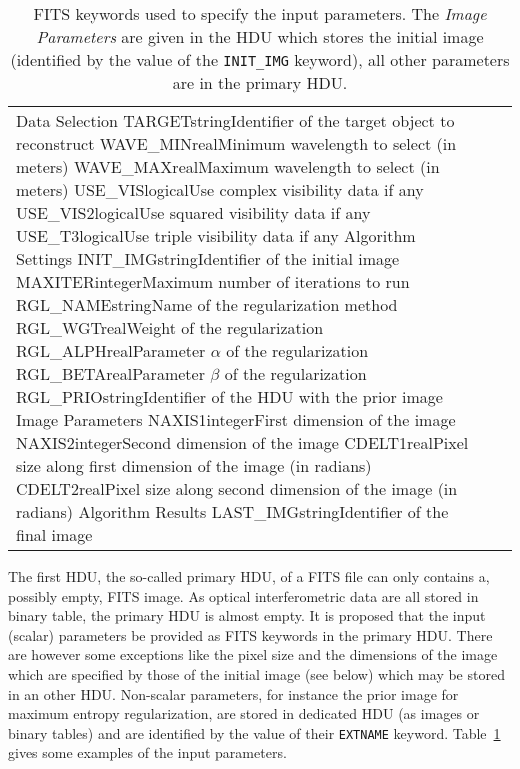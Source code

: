 \documentclass{article}
\newcommand*{\ROW}{} %
\newcommand*{\ROWTITLE}{} %
\newcommand{\KEYWORD}[1]{\texttt{#1}} %
\begin{document}
\begin{table}
\caption{FITS keywords used to specify the input parameters.  The \emph{Image
Parameters} are given in the HDU which stores the initial image (identified by
the value of the \KEYWORD{INIT\_IMG} keyword), all other parameters are in the
primary HDU. \label{tab:input-params}}

\begin{tabular}{lcl}
  \hline
  \ROWTITLE{Data Selection}
  \hline
  \ROW{TARGET}{string}{Identifier of the target object to reconstruct}
  \ROW{WAVE\_MIN}{real}{Minimum wavelength to select (in meters)}
  \ROW{WAVE\_MAX}{real}{Maximum wavelength to select (in meters)}
  \ROW{USE\_VIS}{logical}{Use complex visibility data if any}
  \ROW{USE\_VIS2}{logical}{Use squared visibility data if any}
  \ROW{USE\_T3}{logical}{Use triple visibility data if any}
  \hline
  \ROWTITLE{Algorithm Settings}
  \hline
  \ROW{INIT\_IMG}{string}{Identifier of the initial image}
  \ROW{MAXITER}{integer}{Maximum number of iterations to run}
  \ROW{RGL\_NAME}{string}{Name of the regularization method}
  \ROW{RGL\_WGT}{real}{Weight of the regularization}
  \ROW{RGL\_ALPH}{real}{Parameter $\alpha$ of the regularization}
  \ROW{RGL\_BETA}{real}{Parameter $\beta$ of the regularization}
  \ROW{RGL\_PRIO}{string}{Identifier of the HDU with the prior image}
  \hline
  \ROWTITLE{Image Parameters}
  \hline
  \ROW{NAXIS1}{integer}{First dimension of the image}
  \ROW{NAXIS2}{integer}{Second dimension of the image}
  \ROW{CDELT1}{real}{Pixel size along first dimension of the image (in radians)}
  \ROW{CDELT2}{real}{Pixel size along second dimension of the image (in radians)}
  \hline
  \ROWTITLE{Algorithm Results}
  \hline
  \ROW{LAST\_IMG}{string}{Identifier of the final image}
  \hline
\end{tabular}
\end{table}

The first HDU, the so-called primary HDU, of a FITS file can only contains a,
possibly empty, FITS image. As optical interferometric data are all stored in
binary table, the primary HDU is almost empty. It is proposed that the input
(scalar) parameters be provided as FITS keywords in the primary HDU. There are
however some exceptions like the pixel size and the dimensions of the image
which are specified by those of the initial image (see below) which may be
stored in an other HDU.  Non-scalar parameters, for instance the prior image
for maximum entropy regularization, are stored in dedicated HDU (as images or
binary tables) and are identified by the value of their \KEYWORD{EXTNAME}
keyword.  Table~\ref{tab:input-params} gives some examples of the input
parameters.
\end{document}
